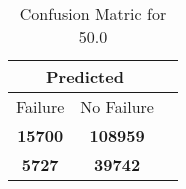 \begin{table}[] 
\caption{Confusion Matric for 50.0} 
\label{Table: Prediction Accuracy-DMD50.0OnlySunEKF-resetReflectionEKF-top2-Reflection} 
\centering 
\begin{tabular} 
 {@{}ccc@{}} 
\toprule 
\multicolumn{2}{c}{\textbf{Predicted}}
 \\ \midrule 
\multicolumn{1}{|c|}{Failure} & 
\multicolumn{1}{c|}{No Failure}
 \\ \midrule 
\multicolumn{1}{|c|}{\color{green}\textbf{15700}} & 
\multicolumn{1}{c|}{\color{green}\textbf{108959}}
 \\ \midrule 
\multicolumn{1}{|c|}{\color{red}\textbf{5727}} & 
\multicolumn{1}{c|}{\color{red}\textbf{39742}}
 \\ \bottomrule 
\end{tabular} 
\end{table} 
